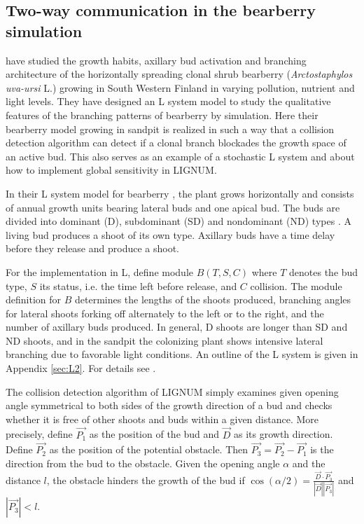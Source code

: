 \subsection{Two-way communication in the bearberry simulation}
\label{sec:bearberry}

\citet{salemaa:02}  have  studied  the  growth  habits,  axillary  bud
activation  and branching architecture  of the  horizontally spreading
clonal shrub  bearberry (\textit{Arctostaphylos uva-ursi} L.)  growing
in  South Western  Finland in  varying pollution,  nutrient  and light
levels.  They have designed an L system model to study the qualitative
features of  the branching patterns of bearberry  by simulation.  Here
their bearberry  model growing  in sandpit is  realized in such  a way
that a  collision detection  algorithm can detect  if a  clonal branch
blockades the growth  space of an active bud.  This  also serves as an
example  of a  stochastic  L  system \citep{pp:90}  and  about how  to
implement global sensitivity \citep{kurth:94} in LIGNUM.

In their  L system model  for bearberry \citep{salemaa:02},  the plant
grows horizontally and consists of annual growth units bearing lateral
buds  and one apical  bud.  The  buds are  divided into  dominant (D),
subdominant  (SD) and nondominant  (ND) types  \citep{remphrey:83}.  A
living bud  produces a shoot  of its own  type.  Axillary buds  have a
time delay before they release and produce a shoot.

For  the  implementation in  L,  define  module  $B(T,S,C)$ where  $T$
denotes  the bud  type,  $S$ its  status,  i.e. the  time left  before
release, and $C$ collision.   The module definition for $B$ determines
the  lengths of  the  shoots produced,  branching  angles for  lateral
shoots forking  off alternately to the  left or to the  right, and the
number of  axillary buds  produced.  In general,  D shoots  are longer
than SD and  ND shoots, and in the sandpit  the colonizing plant shows
intensive  lateral branching  due to  favorable light  conditions.  An
outline  of the  L  system  is given  in  Appendix \ref{sec:L2}.   For
details see \citet{salemaa:02}.

The  collision detection  algorithm  of LIGNUM  simply examines  given
opening angle symmetrical  to both sides of the  growth direction of a
bud and  checks whether it is free  of other shoots and  buds within a
given distance.  More precisely, define $\vec {P_1}$ as the position of
the bud and $\vec D$ as  its growth direction.  Define $\vec {P_2}$ as
the position of the potential  obstacle. Then $\vec {P_3} = \vec {P_2}
- \vec {P_1}$  is the direction from  the bud to  the obstacle.  Given
the opening angle $\alpha$ and  the distance $l$, the obstacle hinders
the growth of the bud  if $\cos(\alpha/2) = \frac{{\vec D} \cdot {\vec
{P_3}}} {|\vec D||\vec {P_3}|}$ and $|\vec {P_3}| < l$.

